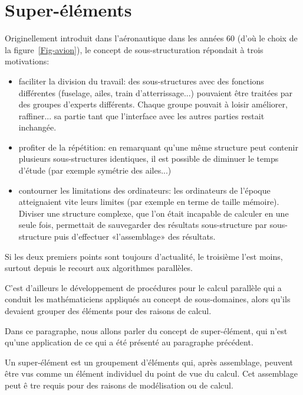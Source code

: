 \medskip
\section{Super-éléments}

\begin{histoire}
Originellement introduit dans l'aéronautique dans les années 60 (d'où le choix de la figure~\ref{Fig-avion}), le concept de sous-structuration répondait à trois motivations:
\begin{itemize}
  \item faciliter la division du travail:
	des sous-structures avec des fonctions différentes (fuselage, ailes, train d'atterrissage...) pouvaient être traitées par des groupes d'experts différents. Chaque groupe pouvait à loisir améliorer, raffiner... sa partie tant que l'interface avec les autres parties restait inchangée.
  \item profiter de la répétition:
	en remarquant qu'une même structure peut contenir plusieurs sous-structures identiques, il est possible de diminuer le temps d'étude (par exemple symétrie des ailes...) 
  \item contourner les limitations des ordinateurs:
	les ordinateurs de l'époque atteignaient vite leurs limites (par exemple en terme de taille mémoire). Diviser une structure complexe, que l'on était incapable de calculer en une seule fois, permettait de sauvegarder des résultats sous-structure par sous-structure puis d'effectuer «l'assemblage» des résultats.
\end{itemize}
Si les deux premiers points sont toujours d'actualité, le troisième l'est moins, surtout depuis le recourt aux algorithmes parallèles.

C'est d'ailleurs le développement de procédures pour le calcul parallèle qui a conduit les mathématiciens appliqués au concept de sous-domaines, alors qu'ils devaient grouper des éléments pour des raisons de calcul.
\end{histoire}

\medskip
Dans ce paragraphe, nous allons parler du concept de super-élément, qui n'est qu'une application de ce qui a été présenté au paragraphe précédent.

\medskip
Un super-élément est un groupement d'éléments qui, après assemblage, peuvent être vus comme un élément individuel du point de vue du calcul. Cet assemblage peut ê tre requis pour des raisons de modélisation ou de calcul.

